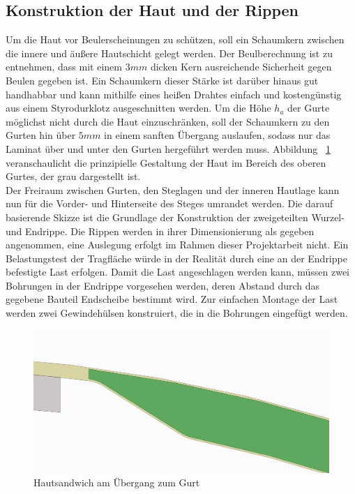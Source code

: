 \subsection{Konstruktion der Haut und der Rippen}
Um die Haut vor Beulerscheinungen zu schützen, soll ein Schaumkern zwischen die innere und äußere Hautschicht gelegt werden. Der Beulberechnung ist zu entnehmen, dass mit einem $ 3mm $ dicken Kern ausreichende Sicherheit gegen Beulen gegeben ist. Ein Schaumkern dieser Stärke ist darüber hinaus gut handhabbar und kann mithilfe eines heißen Drahtes einfach und kostengünstig aus einem Styrodurklotz ausgeschnitten werden. Um die Höhe $ h_{a} $ der Gurte möglichst nicht durch die Haut einzuschränken, soll der Schaumkern zu den Gurten hin über $ 5mm $ in einem sanften Übergang auslaufen, sodass nur das Laminat über und unter den Gurten hergeführt werden muss. Abbildung ~\ref{fig: Hautuebergang} veranschaulicht die prinzipielle Gestaltung der Haut im Bereich des oberen Gurtes, der grau dargestellt ist. \\

\noindent Der Freiraum zwischen Gurten, den Steglagen und der inneren Hautlage kann nun für die Vorder- und Hinterseite des Steges umrandet werden. Die darauf basierende Skizze ist die Grundlage der Konstruktion der zweigeteilten Wurzel- und Endrippe. Die Rippen werden in ihrer Dimensionierung als gegeben angenommen, eine Auslegung erfolgt im Rahmen dieser Projektarbeit nicht. Ein Belastungstest der Tragfläche würde in der Realität durch eine an der Endrippe befestigte Last erfolgen. Damit die Last angeschlagen werden kann, müssen zwei Bohrungen in der Endrippe vorgesehen werden, deren Abstand durch das gegebene Bauteil Endscheibe bestimmt wird. Zur einfachen Montage der Last werden zwei Gewindehülsen konstruiert, die in die Bohrungen eingefügt werden.

\begin{figure}[h]
	\includegraphics[width=1.0\textwidth]{Bilder/Hautuebergang.jpg}
	\caption{Hautsandwich am Übergang zum Gurt}
	\label{fig: Hautuebergang}
\end{figure}

